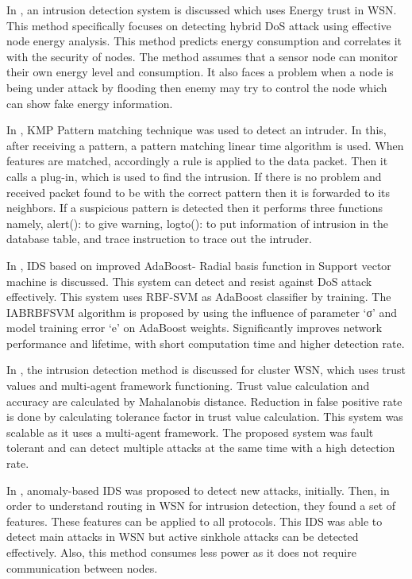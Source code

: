\par
In \cite{jinhui2018intrusion}, an intrusion detection system is discussed which uses Energy trust in WSN. This method specifically focuses on detecting hybrid DoS attack using effective node energy analysis. This method predicts energy consumption and correlates it with the security of nodes. The method assumes that a sensor node can monitor their own energy level and consumption. It also faces a problem when a node is being under attack by flooding then enemy may try to control the node which can show fake energy information.
\par
In \cite{kalnoor2018detection}, KMP Pattern matching technique was used to detect an intruder. In this, after receiving a pattern, a pattern matching linear time algorithm is used. When features are matched, accordingly a rule is applied to the data packet. Then it calls a plug-in, which is used to find the intrusion. If there is no problem and received packet found to be with the correct pattern then it is forwarded to its neighbors. If a suspicious pattern is detected then it performs three functions namely, alert(): to give warning, logto(): to put information of intrusion in the database table, and trace instruction to trace out the intruder.
\par
In \cite{jianjian2018novel},  IDS based on improved AdaBoost- Radial basis function in Support vector machine is discussed. This system can detect and resist against DoS attack effectively. This system uses RBF-SVM as AdaBoost classifier by training. The IABRBFSVM algorithm is proposed by using the influence of parameter ‘σ’ and model training error ‘e’ on AdaBoost weights. Significantly improves network performance and lifetime, with short computation time and higher detection rate.
\par
In \cite{jin2017multi}, the intrusion detection method is discussed for cluster WSN, which uses trust values and multi-agent framework functioning. Trust value calculation and accuracy are calculated by Mahalanobis distance. Reduction in false positive rate is done by calculating tolerance factor in trust value calculation. This system was scalable as it uses a multi-agent framework. The proposed system was fault tolerant and can detect multiple attacks at the same time with a high detection rate.
\par
In \cite{eik2006intrusion}, anomaly-based IDS was proposed to detect new attacks, initially. Then, in order to understand routing in WSN for intrusion detection, they found a set of features. These features can be applied to all protocols. This IDS was able to detect main attacks in WSN but active sinkhole attacks can be detected effectively. Also, this method consumes less power as it does not require communication between nodes.
